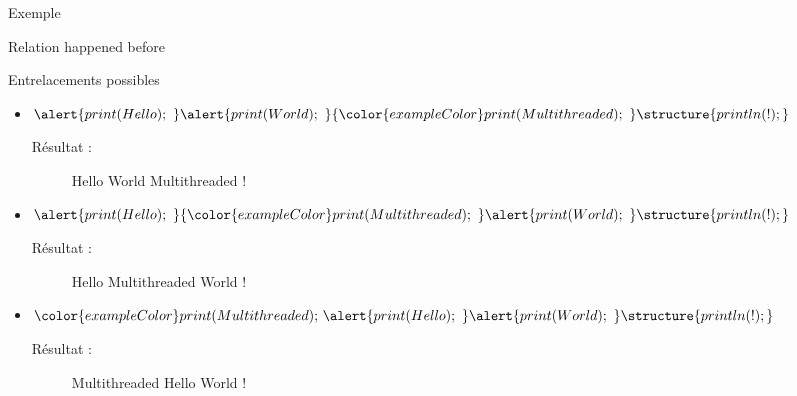 
\begingroup

\begin{frame}[fragile]{Exemple}

  \begin{block}{Relation happened before}
    \begin{center}
    \end{center}
  \end{block}

  \begin{block}{Entrelacements possibles}
    \begin{itemize}
    \item $\alert{print(Hello);~ } \alert{print(World);~ } {\color{exampleColor}print(Multithreaded);~ } \structure{println(!); }$
      \begin{description}
      \item[Résultat :] Hello World Multithreaded !
      \end{description}
    \item\vspace{2mm} $\alert{print(Hello);~ } {\color{exampleColor}print(Multithreaded);~ } \alert{print(World);~ } \structure{println(!); }$
      \begin{description}
      \item[Résultat :] Hello Multithreaded World !
      \end{description}
    \item\vspace{2mm} ${\color{exampleColor}print(Multithreaded);~ } \alert{print(Hello);~ } \alert{print(World);~ } \structure{println(!); }$
      \begin{description}
      \item[Résultat :] Multithreaded Hello World !
      \end{description}
    \end{itemize}
  \end{block}
\end{frame}

\endgroup
\endinput
